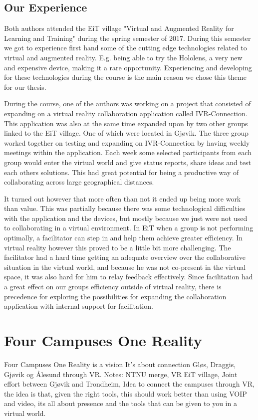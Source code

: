         \subsection{Our Experience}
        Both authors attended the EiT village "Virtual and Augmented Reality for Learning and Training" during the spring semester of 2017. During this semester we got to experience first hand some of the cutting edge technologies related to virtual and augmented reality. E.g. being able to try the Hololens, a very new and expensive device, making it a rare opportunity. Experiencing and developing for these technologies during the course is the main reason we chose this theme for our thesis.
        
        During the course, one of the authors was working on a project that consisted of expanding on a virtual reality collaboration application called IVR-Connection. This application was also at the same time expanded upon by two other groups linked to the EiT village. One of which were located in Gjøvik. The three group worked together on testing and expanding on IVR-Connection by having weekly meetings within the application. Each week some selected participants from each group would enter the virtual world and give status reports, share ideas and test each others solutions. This had great potential for being a productive way of collaborating across large geographical distances.
        
        It turned out however that more often than not it ended up being more work than value. This was partially because there was some technological difficulties with the application and the devices, but mostly because we just were not used to collaborating in a virtual environment. In EiT when a group is not performing optimally, a facilitator can step in and help them achieve greater efficiency. In virtual reality however this proved to be a little bit more challenging. The facilitator had a hard time getting an adequate overview over the collaborative situation in the virtual world, and because he was not co-present in the virtual space, it was also hard for him to relay feedback effectively. Since facilitation had a great effect on our groups efficiency outside of virtual reality, there is precedence for exploring the possibilities for expanding the collaboration application with internal support for facilitation.
        
    \section{Four Campuses One Reality}
    Four Campuses One Reality is a vision
    It's about connection Gløs, Draggis, Gjøvik og Ålesund through VR.
    Notes: NTNU merge, VR EiT village, Joint effort between Gjøvik and Trondheim, Idea to connect the campuses through VR, the idea is that, given the right tools, this should work better than using VOIP and video, its all about presence and the tools that can be given to you in a virtual world. \cite{4C1R}
    
